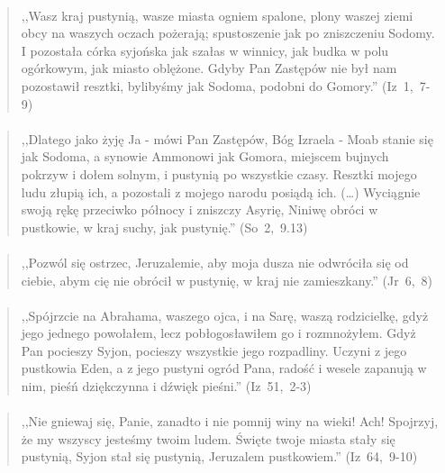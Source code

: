 \documentclass[10pt,a4paper,oneside]{article}
\begin{document}
\paragraph{}
\begin{quote}
,,Wasz kraj pustynią, wasze miasta ogniem spalone, plony waszej ziemi obcy na waszych oczach pożerają; spustoszenie jak po zniszczeniu Sodomy. I pozostała córka syjońska jak szałas w winnicy, jak budka w polu ogórkowym, jak miasto oblężone. Gdyby Pan Zastępów nie był nam pozostawił resztki, bylibyśmy jak Sodoma, podobni do Gomory.'' \mbox{(Iz 1, 7-9)}
\end{quote}
\paragraph{}
\begin{quote}
,,Dlatego jako żyję Ja - mówi Pan Zastępów, Bóg Izraela - Moab stanie się jak Sodoma, a synowie Ammonowi jak Gomora, miejscem bujnych pokrzyw i dołem solnym, i pustynią po wszystkie czasy. Resztki mojego ludu złupią ich, a pozostali z mojego narodu posiądą ich. (\ldots) Wyciągnie swoją rękę przeciwko północy i zniszczy Asyrię, Niniwę obróci w pustkowie, w kraj suchy, jak pustynię.'' \mbox{(So 2, 9.13)}
\end{quote}
\paragraph{}
\begin{quote}
,,Pozwól się ostrzec, Jeruzalemie, aby moja dusza nie odwróciła się od ciebie, abym cię nie obrócił w pustynię, w kraj nie zamieszkany.'' \mbox{(Jr 6, 8)}
\end{quote}
\paragraph{}
\begin{quote}
,,Spójrzcie na Abrahama, waszego ojca, i na Sarę, waszą rodzicielkę, gdyż jego jednego powołałem, lecz pobłogosławiłem go i rozmnożyłem. Gdyż Pan pocieszy Syjon, pocieszy wszystkie jego rozpadliny. Uczyni z jego pustkowia Eden, a z jego pustyni ogród Pana, radość i wesele zapanują w nim, pieśń dziękczynna i dźwięk pieśni.'' \mbox{(Iz 51, 2-3)}
\end{quote}
\paragraph{}
\begin{quote}
,,Nie gniewaj się, Panie, zanadto i nie pomnij winy na wieki! Ach! Spojrzyj, że my wszyscy jesteśmy twoim ludem. Święte twoje miasta stały się pustynią, Syjon stał się pustynią, Jeruzalem pustkowiem.'' \mbox{(Iz 64, 9-10)}
\end{quote}
\end{document}
